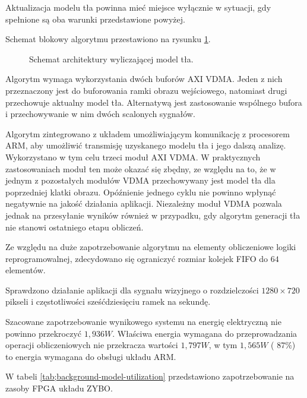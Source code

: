 Aktualizacja modelu tła powinna mieć miejsce wyłącznie w sytuacji, gdy spełnione są oba warunki przedstawione powyżej.

Schemat blokowy algorytmu przestawiono na rysunku \ref{fig:background-model}.

\begin{figure}[h]
	\centering
	\def\svgwidth{\textwidth}
	
	\caption{Schemat architektury wyliczającej model tła.}
	\label{fig:background-model}
\end{figure}

Algorytm wymaga wykorzystania dwóch buforów AXI VDMA. Jeden z nich przeznaczony jest do buforowania ramki obrazu wejściowego, natomiast drugi przechowuje aktualny model tła. Alternatywą jest zastosowanie wspólnego bufora i przechowywanie w nim dwóch scalonych sygnałów.

Algorytm zintegrowano z układem umożliwiającym komunikację z procesorem ARM, aby umożliwić transmisję uzyskanego modelu tła i jego dalszą analizę. Wykorzystano w tym celu trzeci moduł AXI VDMA. W praktycznych zastosowaniach moduł ten może okazać się zbędny, ze względu na to, że w jednym z pozostałych modułów VDMA przechowywany jest model tła dla poprzedniej klatki obrazu. Opóźnienie jednego cyklu nie powinno wpłynąć negatywnie na jakość działania aplikacji. Niezależny moduł VDMA pozwala jednak na przesyłanie wyników również w przypadku, gdy algorytm generacji tła nie stanowi ostatniego etapu obliczeń.


Ze względu na duże zapotrzebowanie algorytmu na elementy obliczeniowe logiki reprogramowalnej, zdecydowano się ograniczyć rozmiar kolejek FIFO do $64$ elementów.

Sprawdzono działanie aplikacji dla sygnału wizyjnego o rozdzielczości $1280 \times 720$ pikseli i częstotliwości sześćdziesięciu ramek na sekundę.

Szacowane zapotrzebowanie wynikowego systemu na energię elektryczną nie powinno przekroczyć $1,936W$. Właściwa energia wymagana do przeprowadzania operacji obliczeniowych nie przekracza wartości $1,797W$, w tym $1,565W$ ( $87\%$) to energia wymagana do obsługi układu ARM.


W tabeli \ref{tab;background-model-utilization} przedstawiono zapotrzebowanie na zasoby FPGA układu ZYBO.

